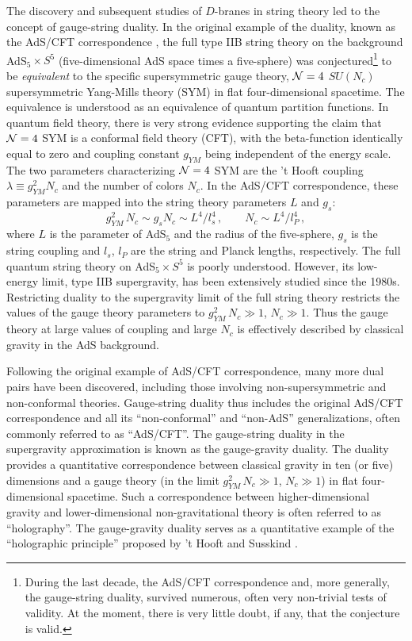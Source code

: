 \documentclass[]{iopart}
\begin{document}
The discovery \cite{Polchinski:1995mt} and subsequent studies of $D$-branes in
string theory led to the concept of gauge-string duality. In the original
example of the duality, known as the AdS/CFT correspondence
\cite{Maldacena:1997re}, the full type IIB string theory on the background
AdS$_5\times S^5$ (five-dimensional AdS space times a five-sphere) was
conjectured\footnote{During the last decade, the AdS/CFT correspondence and,
  more generally, the gauge-string duality, survived numerous, often very
  non-trivial tests of validity. At the moment, there is very little doubt, if
  any, that the conjecture is valid.}  to be {\it equivalent} to the specific
supersymmetric gauge theory, ${\cal N}=4$ $SU(N_c)$ supersymmetric Yang-Mills
theory (SYM) in flat four-dimensional spacetime.  The equivalence is
understood as an equivalence of quantum partition functions.  In quantum field
theory, there is very strong evidence supporting the claim that ${\cal N}=4$
SYM is a conformal field theory (CFT), with the beta-function identically
equal to zero and coupling constant $g_{YM}$ being independent of the energy
scale. The two parameters characterizing ${\cal N}=4$ SYM are the 't Hooft
coupling $\lambda \equiv g_{YM}^2 N_c$ and the number of colors $N_c$. In the
AdS/CFT correspondence, these parameters are mapped into the string theory
parameters $L$ and $g_s$:
%
\begin{equation}
g^2_{YM}\, N_c \sim g_sN_c \sim L^4 / l_s^4\,, \qquad  N_c \sim L^4 / l_P^4\,,
\end{equation}
%
where $L$ is the parameter of AdS$_5$ and the radius of the five-sphere, $g_s$
is the string coupling and $l_s$, $l_P$ are the string and Planck lengths,
respectively. The full quantum string theory on AdS$_5\times S^5$ is poorly
understood.  However, its low-energy limit, type IIB supergravity, has been
extensively studied since the 1980s.  Restricting duality to the supergravity
limit of the full string theory restricts the values of the gauge theory
parameters to $g^2_{YM}\, N_c \gg 1$, $N_c \gg 1$.  Thus the gauge theory at
large values of coupling and large $N_c$ is effectively described by classical
gravity in the AdS background.

Following the original example of AdS/CFT correspondence, many more dual pairs
have been discovered, including those involving non-supersymmetric and
non-conformal theories. Gauge-string duality thus includes the original
AdS/CFT correspondence and all its ``non-conformal'' and ``non-AdS''
generalizations, often commonly referred to as ``AdS/CFT''.  The gauge-string
duality in the supergravity approximation is known as the gauge-gravity
duality. The duality provides a quantitative correspondence between classical
gravity in ten (or five) dimensions and a gauge theory (in the limit
$g^2_{YM}\, N_c \gg 1$, $N_c \gg 1$) in flat four-dimensional spacetime. Such
a correspondence between higher-dimensional gravity and lower-dimensional
non-gravitational theory is often referred to as ``holography''. The
gauge-gravity duality serves as a quantitative example of the ``holographic
principle'' proposed by 't Hooft and Susskind
\cite{'tHooft:1993gx,Susskind:1994vu}.
\end{document}
